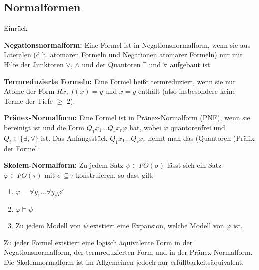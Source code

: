\documentclass[12pt,a4paper]{article}
\begin{document}
	\subsection{Normalformen}
		\begin{labeling}{Einrück}
			\item [\textbf{Negationsnormalform:}] Eine Formel ist in Negationsnormalform, wenn sie aus
Literalen (d.h. atomaren Formeln und Negationen atomarer Formeln)
nur mit Hilfe der Junktoren $\lor$, $\land$ und der Quantoren $\exists$ und $\forall$ aufgebaut
ist. 

\item[\textbf{Termreduzierte Formeln:}] Eine Formel heißt termreduziert,
wenn sie nur Atome der Form $R\overline{x}$, $f(\overline{x}) = y$ und $x = y$ enthält (also
insbesondere keine Terme der Tiefe $\geq$ 2).

\item[\textbf{Pränex-Normalform:}] Eine Formel ist in Pränex-Normalform (PNF), wenn sie
bereinigt ist und die Form $Q_1x_1 ... Q_rx_r\varphi$ hat, wobei $\varphi$ quantorenfrei
und $Q_i \in \{\exists, \forall \}$ ist. Das Anfangsstück $Q_1x_1 ... Q_rx_r$ nennt man das
(Quantoren-)Präfix der Formel.

\item[\textbf{Skolem-Normalform:}] 
Zu jedem Satz $\psi \in FO(\sigma)$ lässt sich ein Satz $\varphi \in FO(\tau)$ mit $\sigma \subseteq \tau$ konstruieren, so dass gilt:
	\begin{enumerate}
	 \item $\varphi = \forall y_1 ... \forall y_s \varphi'$
	 \item $\varphi \models \psi$
	 \item Zu jedem Modell von $\psi$ existiert eine Expansion, welche Modell von $\varphi$ ist.
	\end{enumerate}
	Zu jeder Formel existiert eine logisch äquivalente Form in der Negationsnormalform, der termreduzierten Form und in der Pränex-Normalform. Die Skolemnormalform ist im Allgemeinen jedoch nur erfüllbarkeitsäquivalent.
		\end{labeling}
\end{document}
